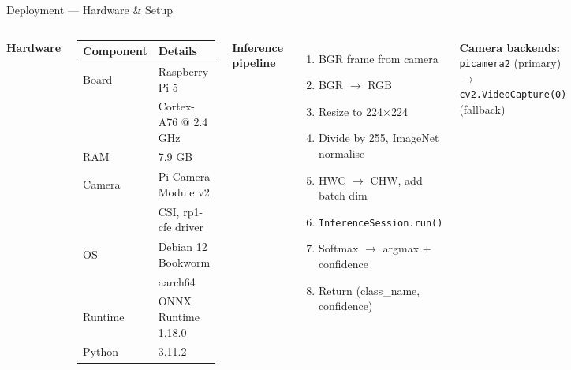 \documentclass[aspectratio=169]{beamer}
\begin{document}
\begin{frame}{Deployment — Hardware \& Setup}
  \begin{columns}
      \textbf{Hardware}
      \begin{center}
      \begin{tabular}{ll}
        \toprule
        Component & Details \\
        \midrule
        Board   & Raspberry Pi 5 \\
                & Cortex-A76 @ 2.4 GHz \\
        RAM     & 7.9 GB \\
        Camera  & Pi Camera Module v2 \\
                & CSI, rp1-cfe driver \\
        OS      & Debian 12 Bookworm \\
                & aarch64 \\
        Runtime & ONNX Runtime 1.18.0 \\
        Python  & 3.11.2 \\
        \bottomrule
      \end{tabular}
      \end{center}
      \textbf{Inference pipeline}
      \begin{enumerate}
        \item BGR frame from camera
        \item BGR $\rightarrow$ RGB
        \item Resize to 224$\times$224
        \item Divide by 255, ImageNet normalise
        \item HWC $\rightarrow$ CHW, add batch dim
        \item \texttt{InferenceSession.run()}
        \item Softmax $\rightarrow$ argmax + confidence
        \item Return (class\_name, confidence)
      \end{enumerate}
      \vspace{0.2cm}
      \textbf{Camera backends:}\\
      \texttt{picamera2} (primary) $\rightarrow$\\
      \texttt{cv2.VideoCapture(0)} (fallback)
  \end{columns}
\end{frame}
\end{document}
